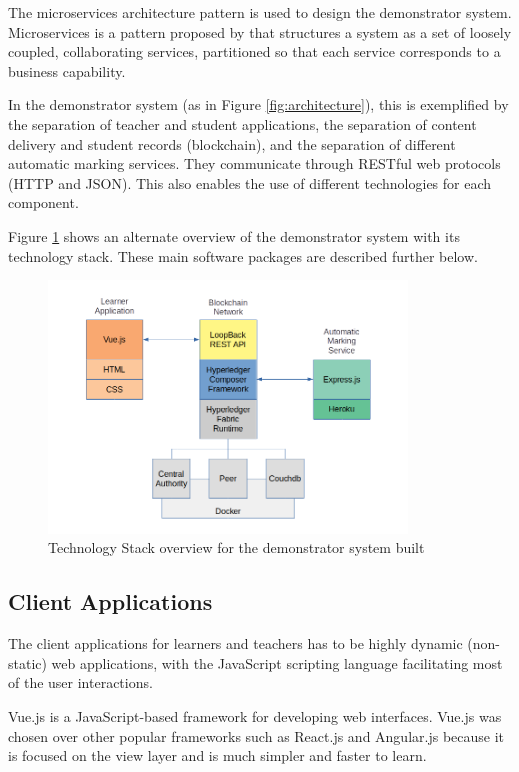 The microservices architecture pattern is used to design the demonstrator system. Microservices is a pattern proposed by 
\citet{richardson2018ms} that structures a system as a set of loosely coupled, collaborating services, partitioned so that 
each service corresponds to a business capability.

In the demonstrator system (as in Figure \ref{fig:architecture}), this is exemplified by the separation of teacher and student applications, 
the separation of content delivery and student records (blockchain), and the separation of different automatic marking services.
They communicate through RESTful web protocols (HTTP and JSON). 
This also enables the use of different technologies for each component.

Figure \ref{fig:techstack} shows an alternate overview of the demonstrator system with its technology stack. 
These main software packages are described further below.

\begin{figure}[!ht] 
    \centering    
    \includegraphics[width=0.85\textwidth]{techstack}
    \caption[Demonstrator Technology Stack]
        {Technology Stack overview for the demonstrator system built}
    \label{fig:techstack}
\end{figure} 

\subsection{Client Applications}

The client applications for learners and teachers has to be highly dynamic (non-static) web applications, 
with the JavaScript scripting language facilitating most of the user interactions.

Vue.js is a JavaScript-based framework for developing web interfaces. Vue.js was chosen over other 
popular frameworks such as React.js and Angular.js because it is focused on the view layer and is much 
simpler and faster to learn.

